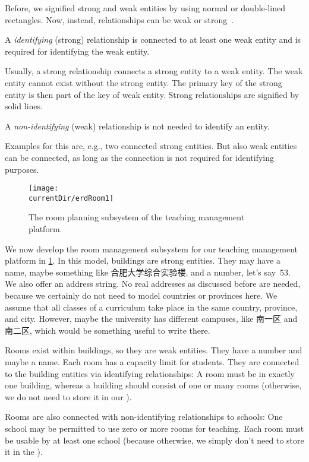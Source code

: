 Before, we signified strong and weak entities by using normal or double-lined rectangles.
Now, instead, relationships can be weak or strong~\cite{P2024C6DS:EM}.%
%
\begin{definition}%
A \emph{identifying} (strong) relationship is connected to at least one weak entity and is required for identifying the weak entity. %
\end{definition}%
%
Usually, a strong relationship connects a strong entity to a weak entity.
The weak entity cannot exist without the strong entity.
The primary key of the strong entity is then part of the key of weak entity.
Strong relationships are signified by solid lines.%
%
\begin{definition}%
A \emph{non-identifying} (weak) relationship is not needed to identify an entity.%
\end{definition}%
Examples for this are, e.g., two connected strong entities.
But also weak entities can be connected, as long as the connection is not required for identifying purposes.

\begin{figure}%
\centering%
\texttt{[image: \\currentDir/erdRoom1]}%
\caption{The room planning subsystem of the teaching management platform.}%
\label{fig:erdRoom1}%
\end{figure}%
%
We now develop the room management subsystem for our teaching management platform in \cref{fig:erdRoom1}.
In this model, buildings are strong entities.
They may have a name, maybe something like 合肥大学综合实验楼, and a number, let's say~53.
We also offer an address string.
No real addresses as discussed before are needed, because we certainly do not need to model countries or provinces here.
We assume that all classes of a curriculum take place in the same country, province, and city.
However, maybe the university has different campuses, like 南一区 and 南二区, which would be something useful to write there.

Rooms exist within buildings, so they are weak entities.
They have a number and maybe a name.
Each room has a capacity limit for students.
They are connected to the building entities via identifying relationships:
A room must be in exactly one building, whereas a building should consist of one or many rooms (otherwise, we do not need to store it in our \db).

Rooms are also connected with non-identifying relationships to schools:
One school may be permitted to use zero or more rooms for teaching.
Each room must be usable by at least one school (because otherwise, we simply don't need to store it in the \db).

